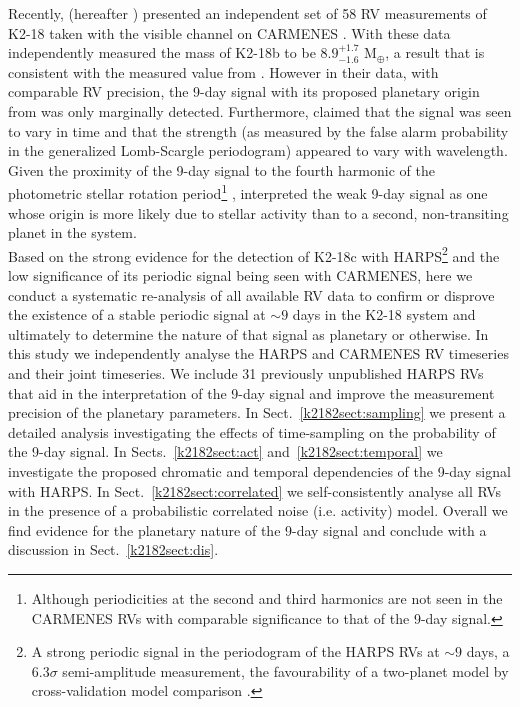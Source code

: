 Recently, \cite{sarkis18} (hereafter )
presented an independent set of 58 RV measurements of K2-18 taken with the visible
channel on CARMENES \citep[561--905 nm;][]{quirrenbach14}.
With these data  independently measured the
mass of K2-18b to be $8.9^{+1.7}_{-1.6}$ M$_{\oplus}$, a result that is consistent with the measured value from
. However in their data, with comparable RV precision, the 9-day signal with its
proposed planetary origin from  was only marginally detected. Furthermore,
 claimed that the signal was seen to vary in time and that the strength (as measured by
the false alarm probability in the generalized Lomb-Scargle periodogram) appeared to vary with
wavelength. Given the proximity of the 9-day signal to the fourth harmonic of the photometric stellar
rotation period\footnote{Although periodicities at the second and third harmonics are not seen in the CARMENES
  RVs with comparable significance to that of the 9-day signal.} , 
 interpreted the weak 9-day signal as one whose origin is more
likely due to stellar activity than to a second, non-transiting planet in the system.  \\

Based on the strong evidence for the detection of K2-18c with HARPS\footnote{A strong
  periodic signal in the periodogram of the HARPS RVs at $\sim 9$ days, a $6.3\sigma$ semi-amplitude measurement,
  the favourability of a two-planet model by cross-validation model comparison .} and the
low significance of its periodic signal being seen with CARMENES, here we conduct a systematic re-analysis of all 
available RV data to confirm or disprove the existence of a stable periodic signal at $\sim 9$ days in the K2-18
system and ultimately to determine the nature of that signal as planetary or otherwise. In this study we
independently analyse the  HARPS and CARMENES RV timeseries and their joint timeseries.
We include 31 previously unpublished HARPS RVs that aid in the interpretation
of the 9-day signal and improve the measurement precision of the planetary parameters.
In Sect.~\ref{k2182sect:sampling} we present a detailed analysis investigating the effects of
time-sampling on the probability of the 9-day signal.
In Sects.~\ref{k2182sect:act} and~\ref{k2182sect:temporal} we investigate the proposed chromatic and temporal dependencies
of the 9-day signal with HARPS. In Sect.~\ref{k2182sect:correlated} we self-consistently analyse all RVs in
the presence of a probabilistic correlated noise (i.e. activity) model.
Overall we find evidence for the planetary nature of the 9-day signal and conclude with a discussion in
Sect.~\ref{k2182sect:dis}. \\

